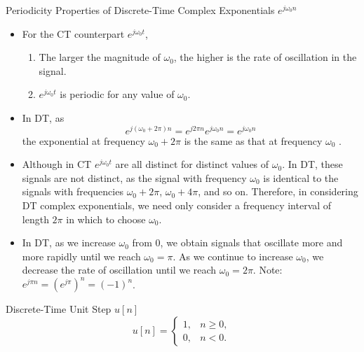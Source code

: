 \begin{frame}{Periodicity Properties of Discrete-Time Complex Exponentials $e^{j\omega_0 n}$}
    \begin{itemize}[<+-| alert@+>]
      \item For the CT counterpart  $e^{j\omega_0 t}$,
        \begin{enumerate}
            \item The larger the magnitude of $\omega_0$, the higher is the rate of oscillation in the signal.
            \item $e^{j\omega_0 t}$ is periodic for any value of $\omega_0$.
        \end{enumerate}
      \item In DT, as 
        \begin{equation*}
            e^{j(\omega_0 + 2\pi)n} = e^{j2\pi n}e^{j\omega_0n} = e^{j\omega_0n}
        \end{equation*}
        the exponential at frequency $\omega_0 + 2\pi$ is the same as that at frequency $\omega_0$ .
      \item Although in CT  $e^{j\omega_0 t}$ are all distinct for distinct values of $\omega_0$. In DT, these signals are not distinct, as the signal with frequency $\omega_0$ is identical to the signals with frequencies $\omega_0 + 2\pi$, $\omega_0 + 4\pi$, and so on. Therefore, in considering DT complex exponentials, we need only consider a frequency interval of length $2\pi$ in which to choose $\omega_0$.
      \item In DT, as we increase $\omega_0$ from 0, we obtain signals that oscillate more and more rapidly until we reach $\omega_0 = \pi$. As we continue to increase $\omega_0$, we decrease the rate of oscillation until we reach $\omega_0 = 2\pi$. Note: $e^{j\pi n} = \left(e^{j\pi}\right)^n = (-1)^n$.
    \end{itemize}
    
\end{frame}


\begin{frame}[plain]{Discrete-Time Unit Step  $u[n]$}
    \begin{equation}
        u[n] = \begin{cases}
                 1, & n \geq 0,\\
                 0, & n<0.
               \end{cases}
    \end{equation}
    {
        {
            \centering
            
        }
    }
\end{frame}

